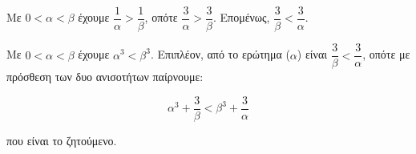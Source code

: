 
\begin{alist}
\item Με $0 < \alpha < \beta$ έχουμε $\dfrac{1}{\alpha} > \dfrac{1}{\beta}$, οπότε $\dfrac{3}{\alpha} > \dfrac{3}{\beta}$. Επομένως, $\dfrac{3}{\beta} < \dfrac{3}{\alpha}$.

\item Με $0 < \alpha < \beta$ έχουμε $\alpha^3 < \beta^3$. Επιπλέον, από το ερώτημα ($\alpha$) είναι $\dfrac{3}{\beta} < \dfrac{3}{\alpha}$, οπότε με πρόσθεση των δυο ανισοτήτων παίρνουμε:

\[\alpha^3 + \dfrac{3}{\beta} < \beta^3 + \dfrac{3}{\alpha}\]

που είναι το ζητούμενο.
\end{alist}

